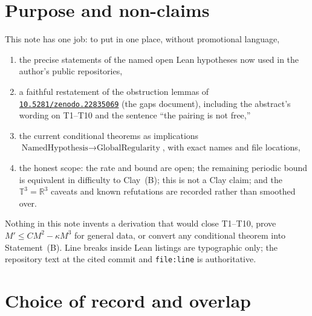 \documentclass[11pt]{article}
\theoremstyle{plain}
\theoremstyle{definition}
\theoremstyle{remark}
\newcommand{\Tthree}{\mathbb{T}^{3}}
\newcommand{\R}{\mathbb{R}}
\newcommand{\doi}[1]{\href{https://doi.org/#1}{\texttt{#1}}}
\begin{document}
\noindent
{}

\tableofcontents
\newpage

\section{Purpose and non-claims}

This note has one job: to put in one place, without promotional language,
\begin{enumerate}[leftmargin=1.4em]
\item the precise statements of the named open Lean hypotheses now used in the author's public repositories,
\item a faithful restatement of the obstruction lemmas of \doi{10.5281/zenodo.22835069} (the gaps document), including the abstract's wording on T1--T10 and the sentence ``the pairing is not free,''
\item the current conditional theorems as implications \(\text{NamedHypothesis}\to\text{GlobalRegularity}\), with exact names and file locations,
\item the honest scope: the rate and bound are open; the remaining periodic bound is equivalent in difficulty to Clay~(B); this is not a Clay claim; and the \(\Tthree=\R^{3}\) caveats and known refutations are recorded rather than smoothed over.
\end{enumerate}

Nothing in this note invents a derivation that would close T1--T10, prove \(M'\le C M^{2}-\kappa M^{3}\) for general data, or convert any conditional theorem into Statement~(B). Line breaks inside Lean listings are typographic only; the repository text at the cited commit and \texttt{file:line} is authoritative.

\section{Choice of record and overlap}
\end{document}
